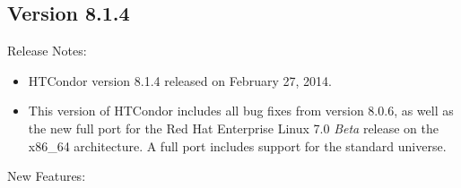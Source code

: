 \subsection*{\label{sec:New-8-1-4}Version 8.1.4}

\noindent Release Notes:

\begin{itemize}

\item HTCondor version 8.1.4 released on February 27, 2014.

\item This version of HTCondor includes all bug fixes from version 8.0.6,
as well as the new full port for the Red Hat Enterprise Linux 7.0 \emph{Beta} 
release on the x86\_64 architecture.
A full port includes support for the standard universe. 

\end{itemize}


\noindent New Features:

